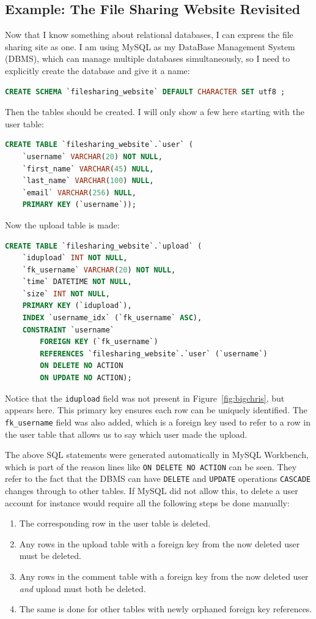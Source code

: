 \documentclass[11pt,a4paper]{report}
\begin{document}
	\subsection{Example: The File Sharing Website Revisited}
	Now that I know something about relational databases, I can express the file sharing site as one. I am using MySQL as my DataBase Management System (DBMS), which can manage multiple databases simultaneously, so I need to explicitly create the database and give it a name:
	\begin{lstlisting}[style=highlightable, frame=none, numbers=none, xleftmargin=0ex, xrightmargin=0ex, language=SQL]
CREATE SCHEMA `filesharing_website` DEFAULT CHARACTER SET utf8 ;
	\end{lstlisting}
	Then the tables should be created. I will only show a few here starting with the {\sc user} table:
	\begin{lstlisting}[style=highlightable, frame=none, numbers=none, xleftmargin=0ex, xrightmargin=0ex, language=SQL]
CREATE TABLE `filesharing_website`.`user` (
	`username` VARCHAR(20) NOT NULL,
	`first_name` VARCHAR(45) NULL,
	`last_name` VARCHAR(100) NULL,
	`email` VARCHAR(256) NULL,
	PRIMARY KEY (`username`));
	\end{lstlisting}
	Now the {\sc upload} table is made:
	\begin{lstlisting}[style=highlightable, frame=none, numbers=none, xleftmargin=0ex, xrightmargin=0ex, language=SQL]
CREATE TABLE `filesharing_website`.`upload` (
	`idupload` INT NOT NULL,
	`fk_username` VARCHAR(20) NOT NULL,
	`time` DATETIME NOT NULL,
	`size` INT NOT NULL,
	PRIMARY KEY (`idupload`),
	INDEX `username_idx` (`fk_username` ASC),
	CONSTRAINT `username`
		FOREIGN KEY (`fk_username`)
		REFERENCES `filesharing_website`.`user` (`username`)
		ON DELETE NO ACTION
		ON UPDATE NO ACTION);
	\end{lstlisting}
	Notice that the \verb|idupload| field was not present in Figure~\ref{fig:bigchris}, but appears here. This primary key ensures each row can be uniquely identified. The \verb|fk_username| field was also added, which is a foreign key used to refer to a row in the {\sc user} table that allows us to say which user made the upload.
	
	The above SQL statements were generated automatically in MySQL Workbench, which is part of the reason lines like \verb|ON DELETE NO ACTION| can be seen. They refer to the fact that the DBMS can have \verb|DELETE| and \verb|UPDATE| operations \verb|CASCADE| changes through to other tables. If MySQL did not allow this, to delete a user account for instance would require all the following steps be done manually:
	\begin{enumerate}
		\item The corresponding row in the {\sc user} table is deleted.
		\item Any rows in the {\sc upload} table with a foreign key from the now deleted user must be deleted.
		\item Any rows in the {\sc comment} table with a foreign key from the now deleted user \textit{and} upload must both be deleted.
		\item The same is done for other tables with newly orphaned foreign key references.
	\end{enumerate}
\end{document}
